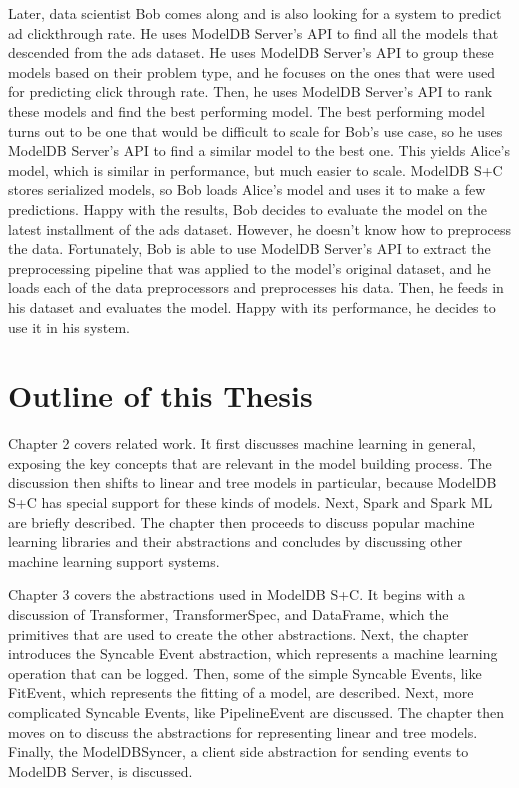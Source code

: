 Later, data scientist Bob comes along and is also looking for a system to predict 
ad clickthrough rate. He uses ModelDB Server's API to find all the models that 
descended from the ads dataset. He uses ModelDB Server's API to group these models
based on their problem type, and he focuses on the ones that were used for predicting click
through rate. Then, he uses ModelDB Server's API to rank these models and find the best performing
model. The best performing model turns out to be one that would be difficult to scale for Bob's
use case, so he uses ModelDB Server's API to find a similar model to the best one. This yields
Alice's model, which is similar in performance, but much easier to scale. ModelDB S+C stores serialized models, so
Bob loads Alice's model and uses it to make a few predictions. Happy with the results, Bob
decides to evaluate the model on the latest installment of the ads dataset. However, he doesn't
know how to preprocess the data. Fortunately, Bob is able to use ModelDB Server's API to extract the 
preprocessing pipeline that was applied to the model's original dataset, and he loads each of
the data preprocessors and preprocesses his data. Then, he feeds in his dataset and evaluates
the model. Happy with its performance, he decides to use it in his system.

\section{Outline of this Thesis}

Chapter 2 covers related work. It first discusses machine learning in general,
exposing the key concepts that are relevant in the model building process. The
discussion then shifts to linear and tree models in particular, because ModelDB S+C has 
special support for these kinds of models. 
Next, Spark and Spark ML are briefly described. The chapter then proceeds to discuss popular
machine learning libraries and their abstractions and concludes by discussing other machine
learning support systems.

Chapter 3 covers the abstractions used in ModelDB S+C.
It begins with a discussion of Transformer, TransformerSpec, and DataFrame, which 
the primitives that are used to create the other abstractions. Next, the chapter
introduces the Syncable Event abstraction, which represents a machine learning
operation that can be logged. Then, some of the simple Syncable Events, like FitEvent,
which represents the fitting of a model, are described. Next, more complicated Syncable
Events, like PipelineEvent are discussed. The chapter then moves on to discuss the
abstractions for representing linear and tree models. Finally, the ModelDBSyncer,
a client side abstraction for sending events to ModelDB Server, is discussed.

